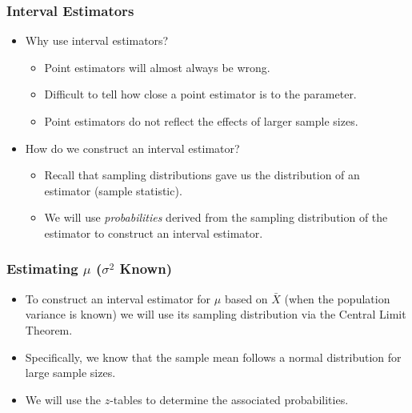 \documentclass[12pt]{beamer}
\begin{document}
\begin{frame}
	\frametitle{Interval Estimators}
	
	\begin{itemize}[label={\color{blue}$\blacktriangleright$}]
		\item Why use interval estimators?
		\begin{itemize}[label={\color{blue}$\blacktriangleright$}]
			\item Point estimators will almost always be wrong.
			\item Difficult to tell how close a point estimator is to the parameter.
			\item Point estimators do not reflect the effects of larger sample sizes.
		\end{itemize}
		
		\item How do we construct an interval estimator?
		\begin{itemize}[label={\color{blue}$\blacktriangleright$}]
			\item Recall that sampling distributions gave us the distribution of an estimator (sample statistic).
			\item We will use \emph{probabilities} derived from the sampling distribution of the estimator to construct an interval estimator.
		\end{itemize}
	\end{itemize}
	
\end{frame}
\begin{frame}
	\frametitle{Estimating $\mu$ ($\sigma^2$ Known)}
	
	\begin{itemize}[label={\color{blue}$\blacktriangleright$}]
		\item To construct an interval estimator for $\mu$ based on $\bar{X}$ (when the population variance is known) we will use its sampling distribution via the Central Limit Theorem.
		
		\item Specifically, we know that the sample mean follows a normal distribution for large sample sizes.
		
		\item We will use the $z$-tables to determine the associated probabilities.
	\end{itemize}
	
\end{frame}
\end{document}
